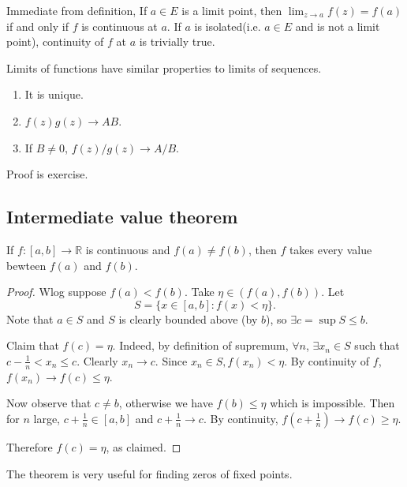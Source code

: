 \begin{remark}
    Immediate from definition, If $ a\in E $ is a limit point, then $ \lim_{z \to a} f(z)=f(a) $ if and only if $f$ is continuous at $a$. If $a$ is isolated(i.e. $a\in E$ and is not a limit point), continuity of $f$ at $a$ is trivially true.
\end{remark}

\begin{sprop}
    Limits of functions have similar properties to limits of sequences.
    \begin{enumerate}
        \item It is unique.
        \item $f(z)g(z)\to AB$.
        \item If $B\neq 0$, $ f(z)/g(z)\to A/B $.
    \end{enumerate}
\end{sprop}
Proof is exercise.

\subsection{Intermediate value theorem}
\begin{theorem}\label{thm:intermediate value theorem}
    If $ f:[a,b]\to \mathbb{R}  $ is continuous and $ f(a)\neq f(b) $, then $f$ takes every value bewteen $f(a)$ and $f(b)$.
\end{theorem}
\begin{proof}
    Wlog suppose $ f(a)<f(b) $. Take $ \eta\in (f(a),f(b)) $. Let 
    \[
        S = \{x\in [a,b]:f(x)<\eta \}.
    \]
    Note that $a\in S$ and $S$ is clearly bounded above (by $b$), so $ \exists c = \sup S\le b $. 
    
    Claim that $f(c)=\eta$. Indeed, by definition of supremum, $ \forall n $, $ \exists x_n\in S$ such that $ c-\frac{1}{n}<x_n\le c $. Clearly $x_n\to c$. Since $ x_n\in S, f(x_n)<\eta $. By continuity of $f$, $f(x_n)\to f(c)\le \eta$. 

    Now observe that $ c\neq b $, otherwise we have $ f(b)\le \eta $ which is impossible. Then for $n$ large, $ c+\frac{1}{n}\in [a,b] $ and $ c+\frac{1}{n}\to c $. By continuity, $ f(c+\frac{1}{n})\to f(c)\ge \eta $.

    Therefore $ f(c)=\eta $, as claimed.
\end{proof}
\begin{remark}
    The theorem is very useful for finding zeros of fixed points.
\end{remark}

